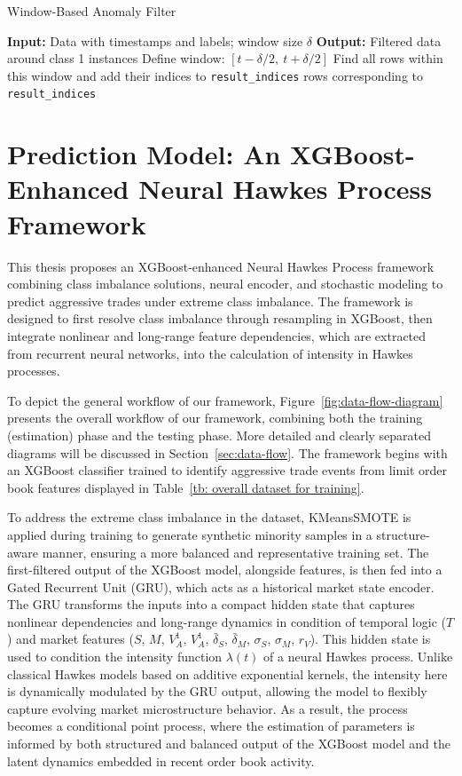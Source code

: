 \begin{algorithm}[H]
\caption{Window-Based Anomaly Filter} \label{al: window-based}
\begin{algorithmic}[1]
\State \textbf{Input:} Data with timestamps and labels; window size $\delta$
\State \textbf{Output:} Filtered data around class 1 instances
    \State Define window: $[t - \delta/2,\ t + \delta/2]$
    \State Find all rows within this window and add their indices to \texttt{result\_indices}
\EndFor
\State \Return rows corresponding to \texttt{result\_indices}
\end{algorithmic}
\end{algorithm}


\section{Prediction Model: An XGBoost-Enhanced Neural Hawkes Process Framework}
This thesis proposes an XGBoost-enhanced Neural Hawkes Process framework combining class imbalance solutions, neural encoder, and stochastic modeling to predict aggressive trades under extreme class imbalance. The framework is designed to first resolve class imbalance through resampling in XGBoost, then integrate nonlinear and long-range feature dependencies, which are extracted from recurrent neural networks, into the calculation of intensity in Hawkes processes. 

To depict the general workflow of our framework, Figure~\ref{fig:data-flow-diagram} presents the overall workflow of our framework, combining both the training (estimation) phase and the testing phase. More detailed and clearly separated diagrams will be discussed in Section~\ref{sec:data-flow}. The framework begins with an XGBoost classifier trained to identify aggressive trade events from limit order book features displayed in Table~\ref{tb: overall dataset for training}. 

To address the extreme class imbalance in the dataset, KMeansSMOTE is applied during training to generate synthetic minority samples in a structure-aware manner, ensuring a more balanced and representative training set. The first-filtered output of the XGBoost model, alongside features, is then fed into a Gated Recurrent Unit (GRU), which acts as a historical market state encoder. The GRU transforms the inputs into a compact hidden state that captures nonlinear dependencies and long-range dynamics in condition of temporal logic ($T$) and market features ($S$, $M$, $V_A^{1}$, $V_A^{1}$, $\bar{\delta}_S$, $\bar{\delta}_M$, $\sigma_S$, $\sigma_M$, $r_V$). This hidden state is used to condition the intensity function $\lambda(t)$ of a neural Hawkes process. Unlike classical Hawkes models based on additive exponential kernels, the intensity here is dynamically modulated by the GRU output, allowing the model to flexibly capture evolving market microstructure behavior. As a result, the process becomes a conditional point process, where the estimation of parameters is informed by both structured and balanced output of the XGBoost model and the latent dynamics embedded in recent order book activity.

